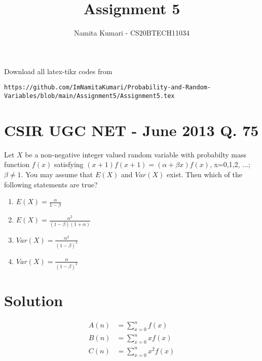 \documentclass[journal,12pt,twocolumn]{IEEEtran}
\begin{document}
\makeatletter
{}
\makeatother
\let\StandardTheFigure\thefigure
\let\vec\mathbf
\renewcommand{\thefigure}{\theproblem}
\def\putbox#1#2#3{\makebox[0in][l]{\makebox[#1][l]{}\raisebox{\baselineskip}[0in][0in]{\raisebox{#2}[0in][0in]{#3}}}}
     \def\rightbox#1{\makebox[0in][r]{#1}}
     \def\centbox#1{\makebox[0in]{#1}}
     \def\topbox#1{\raisebox{-\baselineskip}[0in][0in]{#1}}
     \def\midbox#1{\raisebox{-0.5\baselineskip}[0in][0in]{#1}}
\vspace{3cm}
\title{Assignment 5}
\author{Namita Kumari - CS20BTECH11034}
\maketitle
\newpage
\bigskip
Download all latex-tikz codes from 
%
\begin{lstlisting}
https://github.com/ImNamitaKumari/Probability-and-Random-Variables/blob/main/Assignment5/Assignment5.tex
\end{lstlisting}
\section{CSIR UGC NET - June 2013 Q. 75}
Let $X$ be a non-negative integer valued random variable with probabilty mass function $f(x)$ satisfying $(x+1)f(x+1)=(\alpha+\beta x)f(x)$, x=0,1,2, ...; $\beta\neq 1$. You may assume that $E(X)$ and $Var(X)$ exist. Then which of the following statements are true?
\begin{enumerate}
\item $E(X)=\frac{\alpha}{1-\beta}$
\item $E(X)=\frac{\alpha^2}{(1-\beta)(1+\alpha)}$
\item $Var(X)=\frac{\alpha^2}{(1-\beta)^2}$
\item $Var(X)=\frac{\alpha}{(1-\beta)^2}$
\end{enumerate}
\section{Solution}

\begin{definition}
\label{1}
    \begin{align}
        A(n)&=\sum_{x=0}^nf(x)\\
        B(n)&=\sum_{x=0}^nxf(x)\\
        C(n)&=\sum_{x=0}^nx^2f(x)
    \end{align}
\end{definition}
\end{document}
